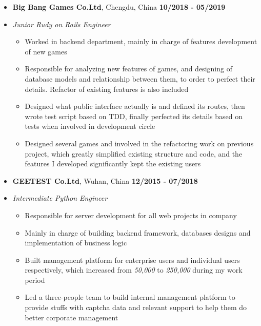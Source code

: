 \documentclass[12pt, a4paper,sans]{moderncv}       %
\begin{document}
    \begin{itemize}

        \item{\textbf{Big Bang Games Co.Ltd}, {Chengdu, China} \hfill\textbf{10/2018 - 05/2019}}
        \item{\textit{Junior Rudy on Rails Engineer}}
        \vspace{2pt}
        \begin{itemize}
            \item {\medium Worked in backend department, mainly in charge of features development of new games}
            \vspace{2pt}
            \item {\medium Responsible for analyzing new features of games, and designing of database models and relationship between them, to order to perfect their details. Refactor of existing features is also included}
            \vspace{2pt}
            \item {\medium Designed what public interface actually is and defined its routes, then wrote test script based on TDD, finally perfected its details based on tests when involved in development circle}
            \vspace{2pt}
            \item {\medium Designed several games and involved in the refactoring work on previous project, which greatly simplified existing structure and code, and the features I developed significantly kept the existing users}
        \end{itemize}


        \vspace{8pt}


        \item{\textbf{GEETEST Co.Ltd}, {Wuhan, China} \hfill\textbf{12/2015 - 07/2018}}
        \item{\textit{Intermediate Python Engineer}}

        \begin{itemize}
            \item { \medium Responsible for server development for all web projects in company}
            \item { \medium Mainly in charge of building backend framework, databases designs and implementation of business logic}
            \item { \medium Built management platform for enterprise users and individual users respectively, which increased from \textit{50,000} to \textit{250,000} during my work period}
            \item { \medium Led a three-people team to build internal management platform to provide stuffs with captcha data and relevant support to help them do better corporate management}
        \end{itemize}


    \end{itemize}
\vspace{-8pt}
\end{document}

